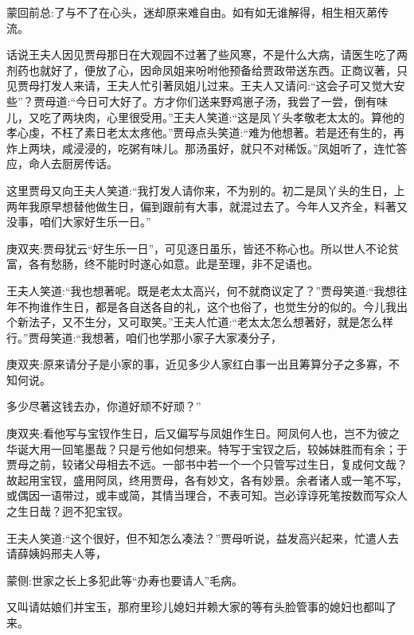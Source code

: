 

\begin{parag}
    \begin{note}蒙回前总:了与不了在心头，迷却原来难自由。如有如无谁解得，相生相灭苐传流。\end{note}
\end{parag}


\begin{parag}
    话说王夫人因见贾母那日在大观园不过著了些风寒，不是什么大病，请医生吃了两剂药也就好了，便放了心，因命凤姐来吩咐他预备给贾政带送东西。正商议著，只见贾母打发人来请，王夫人忙引著凤姐儿过来。王夫人又请问:“这会子可又觉大安些”？贾母道:“今日可大好了。方才你们送来野鸡崽子汤，我尝了一尝，倒有味儿，又吃了两块肉，心里很受用。”王夫人笑道:“这是凤丫头孝敬老太太的。算他的孝心虔，不枉了素日老太太疼他。”贾母点头笑道:“难为他想著。若是还有生的，再炸上两块，咸浸浸的，吃粥有味儿。那汤虽好，就只不对稀饭。”凤姐听了，连忙答应，命人去厨房传话。
\end{parag}


\begin{parag}
    这里贾母又向王夫人笑道:“我打发人请你来，不为别的。初二是凤丫头的生日，上两年我原早想替他做生日，偏到跟前有大事，就混过去了。今年人又齐全，料著又没事，咱们大家好生乐一日。”\begin{note}庚双夹:贾母犹云“好生乐一日”，可见逐日虽乐，皆还不称心也。所以世人不论贫富，各有愁肠，终不能时时遂心如意。此是至理，非不足语也。\end{note}王夫人笑道:“我也想著呢。既是老太太高兴，何不就商议定了？”贾母笑道:“我想往年不拘谁作生日，都是各自送各自的礼，这个也俗了，也觉生分的似的。今儿我出个新法子，又不生分，又可取笑。”王夫人忙道:“老太太怎么想著好，就是怎么样行。”贾母笑道:“我想著，咱们也学那小家子大家凑分子，\begin{note}庚双夹:原来请分子是小家的事，近见多少人家红白事一出且筹算分子之多寡，不知何说。\end{note}多少尽著这钱去办，你道好顽不好顽？”\begin{note}庚双夹:看他写与宝钗作生日，后又偏写与凤姐作生日。阿凤何人也，岂不为彼之华诞大用一回笔墨哉？只是亏他如何想来。特写于宝钗之后，较姊妹胜而有余；于贾母之前，较诸父母相去不远。一部书中若一个一个只管写过生日，复成何文哉？故起用宝钗，盛用阿凤，终用贾母，各有妙文，各有妙景。余者诸人或一笔不写，或偶因一语带过，或丰或简，其情当理合，不表可知。岂必谆谆死笔按数而写众人之生日哉？迥不犯宝钗。\end{note}王夫人笑道:“这个很好，但不知怎么凑法？”贾母听说，益发高兴起来，忙遣人去请薛姨妈邢夫人等，\begin{note}蒙侧:世家之长上多犯此等“办寿也要请人”毛病。\end{note}又叫请姑娘们并宝玉，那府里珍儿媳妇并赖大家的等有头脸管事的媳妇也都叫了来。
\end{parag}


